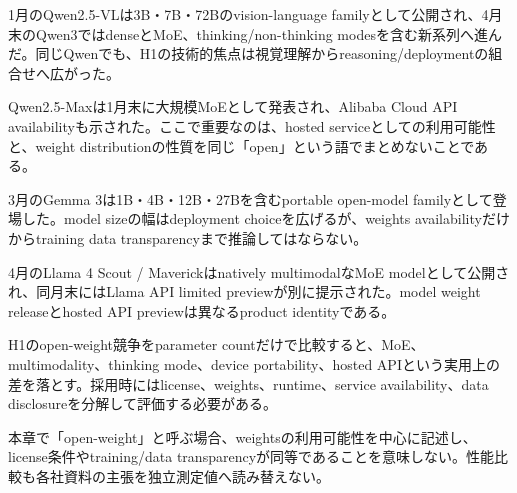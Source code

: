 
1月のQwen2.5-VLは3B・7B・72Bのvision-language familyとして公開され、4月末のQwen3ではdenseとMoE、thinking/non-thinking modesを含む新系列へ進んだ。同じQwenでも、H1の技術的焦点は視覚理解からreasoning/deploymentの組合せへ広がった。\autocite{src-3e4a3f3b3d83,src-dc21f366b638}


Qwen2.5-Maxは1月末に大規模MoEとして発表され、Alibaba Cloud API availabilityも示された。ここで重要なのは、hosted serviceとしての利用可能性と、weight distributionの性質を同じ「open」という語でまとめないことである。\autocite{src-8c485019ad8d}


3月のGemma 3は1B・4B・12B・27Bを含むportable open-model familyとして登場した。model sizeの幅はdeployment choiceを広げるが、weights availabilityだけからtraining data transparencyまで推論してはならない。\autocite{src-1bb16d7254b1}


4月のLlama 4 Scout / Maverickはnatively multimodalなMoE modelとして公開され、同月末にはLlama API limited previewが別に提示された。model weight releaseとhosted API previewは異なるproduct identityである。\autocite{src-05f285e9757b,src-fca961b24baf}


H1のopen-weight競争をparameter countだけで比較すると、MoE、multimodality、thinking mode、device portability、hosted APIという実用上の差を落とす。採用時にはlicense、weights、runtime、service availability、data disclosureを分解して評価する必要がある。\autocite{src-05f285e9757b,src-1bb16d7254b1,src-3e4a3f3b3d83}


\begin{claimboundary}
本章で「open-weight」と呼ぶ場合、weightsの利用可能性を中心に記述し、license条件やtraining/data transparencyが同等であることを意味しない。性能比較も各社資料の主張を独立測定値へ読み替えない。
\end{claimboundary}
